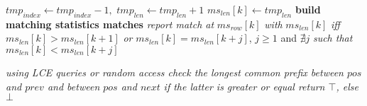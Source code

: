 \documentclass[a4paper,12pt, oneside]{book}
\begin{document}
\begin{algorithm}
\begin{algorithmic}[1]
    \State $tmp_{index}\gets tmp_{index}-1,\,\,tmp_{len}\gets tmp_{len}+1$
    \EndWhile
    \State $ms_{len}[k]\gets tmp_{len}$
    \EndIf
    \EndFor
    \For {\textit{every} $k\in[0,|ms_{row}|)$}
    \Comment \textbf{build matching statistics matches}
    \State \textit{report match at} $ms_{row}[k]$ \textit{with} $ms_{len}[k]$
    \textit{iff} $ms_{len}[k]> ms_{len}[k+1]$
    \State \textit{or} $ms_{len}[k]= ms_{len}[k+j]$, $j\geq 1$ and $\nexists j$
    \textit{such that}  $ms_{len}[k]< ms_{len}[k+j]$
    \EndFor
    \EndFunction
  \end{algorithmic}
  \caption{Algoritmo per match con matching-statistics (MS) e thresholds}
\end{algorithm}
\begin{algorithm}
  \begin{algorithmic}
    \State \textit{using LCE queries or random access check the longest common
    prefix between $pos$ and $prev$ and between $pos$ and $next$}
    \State \textit{if the latter is greater or equal return $\top$, else $\bot$}
    \EndFunction
  \end{algorithmic}
\end{algorithm}
\end{document}
